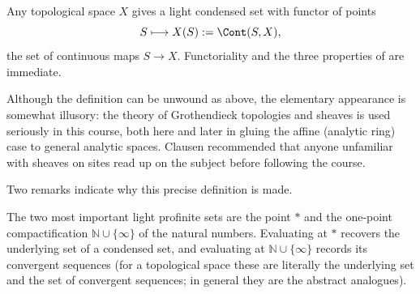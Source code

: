 \begin{example}
\label{ex:1:top-to-condensed}
Any topological space $X$ gives a light condensed set with functor of points
\begin{equation*}
S\longmapsto X(S):=\Cont(S,X),
\end{equation*}
the set of continuous maps $S\to X$. Functoriality and the three properties of
 are immediate.
\end{example}

\begin{remark}
\label{rmk:1:use-grothendieck}
Although the definition can be unwound as above, the elementary appearance is
somewhat illusory: the theory of Grothendieck topologies and sheaves is used
seriously in this course, both here and later in gluing the affine (analytic
ring) case to general analytic spaces. Clausen recommended that anyone unfamiliar
with sheaves on sites read up on the subject before following the course.
\end{remark}

Two remarks indicate why this precise definition is made.

\begin{remark}
\label{rmk:1:two-test-objects}
The two most important light profinite sets are the point $\ast$ and the
one-point compactification $\mathbb{N}\cup\{\infty\}$ of the natural numbers.
Evaluating at $\ast$ recovers the underlying set of a condensed set, and
evaluating at $\mathbb{N}\cup\{\infty\}$ records its convergent sequences (for a
topological space these are literally the underlying set and the set of
convergent sequences; in general they are the abstract analogues).
\end{remark}

